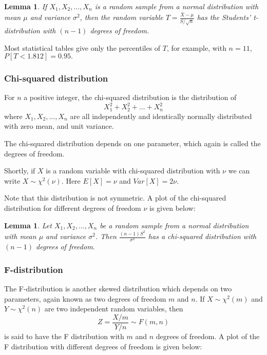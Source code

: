 \documentclass[12pt]{article}
\theoremstyle{break}
\newtheorem{lemma}[theorem]{Lemma}
\begin{document}
\begin{lemma}
If $X_{1},X_{2},\ldots,X_{n}$ is a random sample from a normal distribution with mean $\mu$ and variance $\sigma^2$, then the random variable $\displaystyle T=\frac{\bar{X}-\mu}{S/\sqrt{n}}$ has the Students' t-distribution with $(n-1)$ degrees of freedom.
\end{lemma}
Most statistical tables give only the percentiles of $T$, for example, with $n=11$, $P[T<1.812]=0.95.$

\subsubsection{Chi-squared distribution}
For $n$ a positive integer, the chi-squared distribution is the distribution of
$$
X_{1}^{2}+X_{2}^{2}+\ldots+X_{n}^{2}
$$
where
$X_{1},X_{2},\ldots,X_{n}$ are all independently and identically normally distributed with zero mean, and unit variance.

The chi-squared distribution depends on one parameter, which again is called the degrees of freedom.

Shortly, if $X$ is a random variable with chi-squared distribution with $\nu$ we can write $X \sim \chi^{2}(\nu)$. Here $E[X]=\nu$ and $Var[X]=2\nu$.

Note that this distribution is not symmetric. A plot of the chi-squared distribution for different degrees of freedom $\nu$ is given below:




\begin{lemma}
Let $X_{1},X_{2},\ldots,X_{n}$ be a random sample from a normal distribution with mean $\mu$ and variance $\sigma^2$. Then $\displaystyle \frac{(n-1)S^{2}}{\sigma^{2}}$ has a chi-squared distribution with $(n-1)$ degrees of freedom.
\end{lemma}


\subsubsection{F-distribution}
The F-distribution is another skewed distribution which depends on two parameters, again known as two degrees of freedom $m$ and $n$. If $X \sim \chi^{2}(m)$ and $Y \sim \chi^{2}(n)$ are two independent random variables, then
$$
Z=\frac{X/m}{Y/n}\sim F(m,n)
$$
is said to have the F distribution with $m$ and $n$ degrees of freedom. A plot of the F distribution with different degrees of freedom  is given below:
\end{document}
